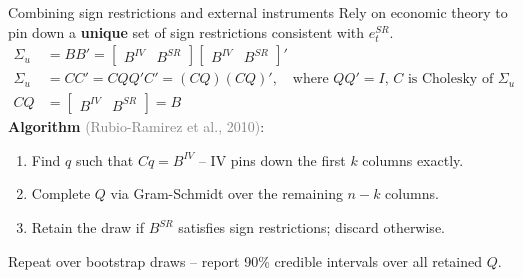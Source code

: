\documentclass[10pt]{beamer}
\begin{document}
\begin{frame}{Combining sign restrictions and external instruments}
Rely on economic theory to pin down a \textbf{unique} set of sign restrictions consistent with $e_t^{SR}$.
\vspace{0.5em}
\begin{align*}
\Sigma_u &= BB' = \begin{bmatrix} B^{IV} & B^{SR} \end{bmatrix}\begin{bmatrix} B^{IV} & B^{SR} \end{bmatrix}' \\[0.3em]
\Sigma_u &= CC' = CQQ'C' = (CQ)(CQ)', \quad \text{where $QQ' = I$, $C$ is Cholesky of $\Sigma_u$} \\[0.3em]
CQ &= \begin{bmatrix} B^{IV} & B^{SR} \end{bmatrix} = B
\end{align*}
\pause
\textbf{Algorithm} \textcolor{gray}{\scriptsize(Rubio-Ramirez et al., 2010)}:
\begin{enumerate}\scriptsize
    \item Find $q$ such that $Cq = B^{IV}$ -- IV pins down the first $k$ columns exactly.
    \item Complete $Q$ via Gram-Schmidt over the remaining $n-k$ columns.
    \item Retain the draw if $B^{SR}$ satisfies sign restrictions; discard otherwise.
\end{enumerate}
\vspace{0.3em}
Repeat over bootstrap draws -- report 90\% credible intervals over all retained $Q$.
\end{frame}
\end{document}

